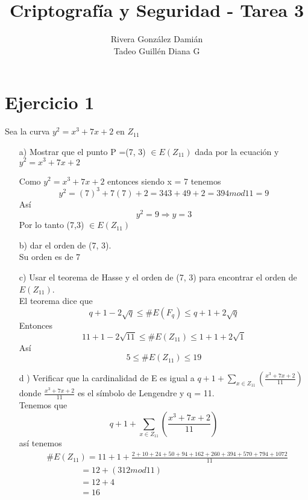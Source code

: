 \documentclass[12pt, letterpaper]{article}
\title{Criptografía y Seguridad - Tarea 3}
\author{Rivera González Damián\\Tadeo Guillén Diana G}
\begin{document}
\maketitle
\section*{Ejercicio 1}
Sea la curva $y^2 = x^3 + 7x + 2$ en $Z_{11}$
\begin{itemize}
\item[a)] Mostrar que el punto P =(7, 3) $\in E(Z_{11})$ dada por la ecuación y $y^2 = x^3 + 7x + 2$

Como $y^2 = x^3 + 7x + 2$ entonces siendo x = 7 tenemos
$$y^2 = (7)^3 + 7(7) + 2 = 343+49+2 = 394 mod 11 = 9$$
Así
$$y^2 = 9 \Rightarrow  y = 3$$
Por lo tanto (7,3) $\in E(Z_{11})$

\item[b) ] dar el orden de (7, 3).\\
Su orden es de 7

\item[c) ] Usar el teorema de Hasse y el orden de (7, 3) para encontrar el orden de $E(Z_{11})$.\\
El teorema dice que
$$q+1-2\sqrt{q} \leq \#E(F_q) \leq q+1+2\sqrt{q}$$
Entonces
$$11+1-2\sqrt{11} \leq \#E(Z_{11}) \leq 1+1+2\sqrt{1}$$
Así
$$5 \leq \#E(Z_{11}) \leq 19$$


\item[d ) ] Verificar que la cardinalidad de E es igual a $q+1+ \sum_{x \in Z_{11}} (\frac{x^3 + 7x + 2}{11})$ donde $\frac{x^3 + 7x + 2}{11}$ es el símbolo de Lengendre y q = 11.\\
Tenemos que 
$$q+1+ \sum_{x \in Z_{11}} (\frac{x^3 + 7x + 2}{11})$$
así tenemos
\begin{equation*}
\begin{split}
	&\#E(Z_{11}) = 11+1+\frac{2+10+24+50+94+162+260+394+570+794+1072}{11}\\
	&\quad\quad\quad\quad = 12 + (312 mod 11)\\
	&\quad\quad\quad\quad = 12 + 4\\ 
	&\quad\quad\quad\quad = 16
\end{split}
\end{equation*}
\end{itemize}
\end{document}

